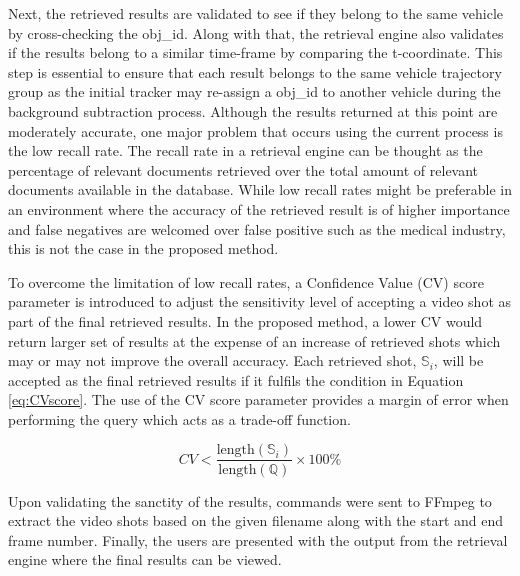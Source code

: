 Next, the retrieved results are validated to see if they belong to the same vehicle by cross-checking the obj\_id. Along with that, the retrieval engine also validates if the results belong to a similar time-frame by comparing the t-coordinate. This step is essential to ensure that each result belongs to the same vehicle trajectory group as the initial tracker may re-assign a obj\_id to another vehicle during the background subtraction process.
Although the results returned at this point are moderately accurate, one major problem that occurs using the current process is the low recall rate. The recall rate in a retrieval engine can be thought as the percentage of relevant documents retrieved over the total amount of relevant documents available in the database. While low recall rates might be preferable in an environment where the accuracy of the retrieved result is of higher importance and false negatives are welcomed over false positive such as the medical industry, this is not the case in the proposed method.

To overcome the limitation of low recall rates, a Confidence Value (CV) score parameter is introduced to adjust the sensitivity level of accepting a video shot as part of the final retrieved results. In the proposed method, a lower CV would return larger set of results at the expense of an increase of retrieved shots which may or may not improve the overall accuracy. Each retrieved shot, $\mathbb{S}_i$, will be accepted as the final retrieved results if it fulfils the condition in Equation \ref{eq:CVscore}. The use of the CV score parameter provides a margin of error when performing the query which acts as a trade-off function.

\begin{equation}
\label{eq:CVscore}
CV < \frac{\text{length}(\mathbb{S}_i)}{\text{length}(\mathbb{Q})} \times 100\%
\end{equation}

Upon validating the sanctity of the results, commands were sent to FFmpeg to extract the video shots based on the given filename along with the start and end frame number. Finally, the users are presented with the output from the retrieval engine where the final results can be viewed.


